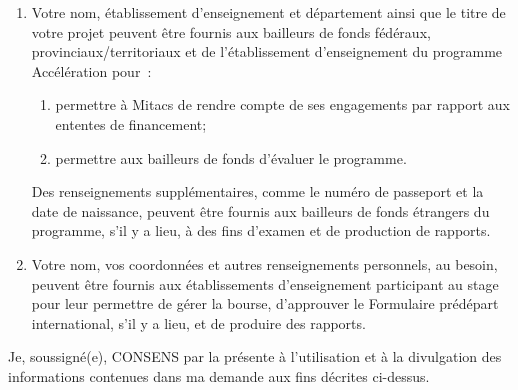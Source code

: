 {\begin{enumerate}
Vous aurez la possibilité de vous désabonner des courriels qui vous sont envoyés lorsque tous les engagements par rapport à la recherche qui fait l'objet de cette demande seront remplis.
\item Votre nom, établissement d'enseignement et département ainsi que le titre de votre projet peuvent être fournis aux bailleurs de fonds fédéraux, provinciaux/territoriaux et de l'établissement d'enseignement du programme Accélération pour :
\begin{enumerate}
\item permettre à Mitacs de rendre compte de ses engagements par rapport aux ententes de financement;
\item permettre aux bailleurs de fonds d'évaluer le programme.
\end{enumerate}
Des renseignements supplémentaires, comme le numéro de passeport et la date de naissance, peuvent être fournis aux bailleurs de fonds étrangers du programme, s'il y a lieu, à des fins d'examen et de production de rapports. 
\item Votre nom, vos coordonnées et autres renseignements personnels, au besoin, peuvent être fournis aux établissements d'enseignement participant au stage pour leur permettre de gérer la bourse, d'approuver le Formulaire prédépart international, s'il y a lieu, et de produire des rapports.
\end{enumerate}

Je, soussigné(e), CONSENS par la présente à l'utilisation et à la divulgation des informations contenues dans ma demande aux fins décrites ci-dessus.
}